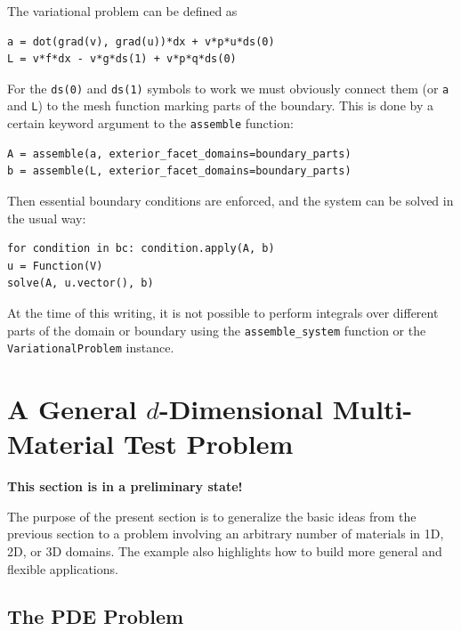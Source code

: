 The variational problem can be defined as
\begin{Verbatim}[fontsize=\fontsize{10pt}{10pt},tabsize=8,baselinestretch=1.05,
fontfamily=tt,xleftmargin=7mm]
a = dot(grad(v), grad(u))*dx + v*p*u*ds(0)
L = v*f*dx - v*g*ds(1) + v*p*q*ds(0)
\end{Verbatim}
\noindent
For the {\fontsize{12pt}{12pt}\texttt{ds(0)}} and {\fontsize{12pt}{12pt}\texttt{ds(1)}} symbols to work we must obviously
connect them (or {\fontsize{12pt}{12pt}\texttt{a}} and {\fontsize{12pt}{12pt}\texttt{L}}) to the mesh function marking
parts of the boundary. This is done by a certain keyword argument
to the {\fontsize{12pt}{12pt}\texttt{assemble}} function:
\begin{Verbatim}[fontsize=\fontsize{10pt}{10pt},tabsize=8,baselinestretch=1.05,
fontfamily=tt,xleftmargin=7mm]
A = assemble(a, exterior_facet_domains=boundary_parts)
b = assemble(L, exterior_facet_domains=boundary_parts)
\end{Verbatim}
\noindent
Then essential boundary conditions are enforced, and the system can
be solved in the usual way:
\begin{Verbatim}[fontsize=\fontsize{10pt}{10pt},tabsize=8,baselinestretch=1.05,
fontfamily=tt,xleftmargin=7mm]
for condition in bc: condition.apply(A, b)
u = Function(V)
solve(A, u.vector(), b)
\end{Verbatim}
\noindent

At the time of this writing, it is not possible to perform integrals over
different parts of the domain or boundary using the
{\fontsize{12pt}{12pt}\verb!assemble_system!} function or the
{\fontsize{12pt}{12pt}\texttt{VariationalProblem}} instance.


\section{A General $d$-Dimensional Multi-Material Test Problem}
\label{langtangen:possion:nD:nmat}

{\bf This section is in a preliminary state!}

The purpose of the present section is to generalize the basic
ideas from the previous section to a problem involving
an arbitrary number of materials in 1D, 2D, or 3D domains.
The example also highlights how to build more general and flexible
\fenics{} applications.

\subsection{The PDE Problem}
\label{langtangen:possion:nD:nmat:PDE}


